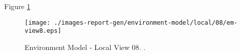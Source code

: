
Figure \ref{fig:lu.uni.lassy.excalibur.examples.icrash-EM-view-local-08} 


\begin{figure}[htbp] 
\label{fig:lu.uni.lassy.excalibur.examples.icrash-EM}
\begin{center}
\texttt{[image: ./images-report-gen/environment-model/local/08/em-view8.eps]}
\end{center}
\caption[Environment Model - Local View 08 - ]{Environment Model - Local View 08. .}
\label{fig:lu.uni.lassy.excalibur.examples.icrash-EM-view-local-08}
\end{figure}
\vspace{0.5cm} 
